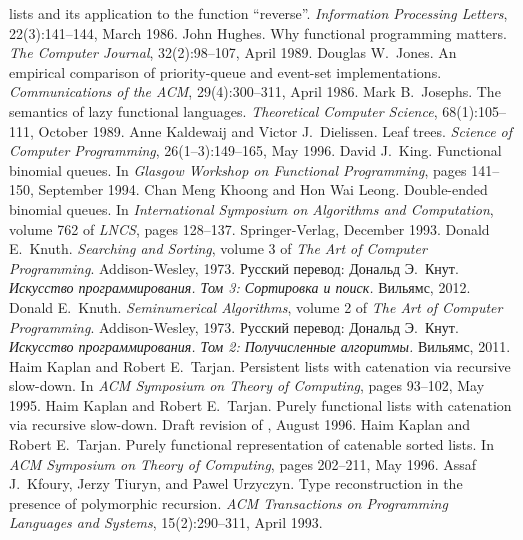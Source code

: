 \begin{thebibliography}{XXXXXXX}
  lists and its application to the function
  ``reverse''. \textit{Information Processing Letters},
  22(3):141--144, March 1986.
 John Hughes. Why functional programming
  matters. \textit{The Computer Journal}, 32(2):98--107, April 1989.
 Douglas W.~Jones. An empirical comparison
  of priority-queue and event-set
  implementations. \textit{Communications of the ACM}, 29(4):300--311,
  April 1986.
 Mark B.~Josephs. The semantics of lazy
  functional languages. \textit{Theoretical Computer Science},
  68(1):105--111, October 1989.
 Anne Kaldewaij and Victor
  J.~Dielissen. Leaf trees. \textit{Science of Computer Programming},
  26(1--3):149--165, May 1996.
 David J.~King. Functional binomial
  queues. In \textit{Glasgow Workshop on Functional Programming},
  pages 141--150, September 1994.
 Chan Meng Khoong and Hon Wai
  Leong. Double-ended binomial queues. In \textit{International
    Symposium on Algorithms and Computation}, volume 762 of
  \textit{LNCS}, pages 128--137. Springer-Verlag, December 1993.
 Donald E.~Knuth. \textit{Searching and
    Sorting}, volume 3 of \textit{The Art of Computer
    Programming}. Addison-Wesley, 1973. Русский перевод: Дональд
  Э.~Кнут. \textit{Искусство программирования. Том 3: Сортировка и
    поиск.}\/ Вильямс, 2012.
 Donald E.~Knuth. \textit{Seminumerical
    Algorithms}, volume 2 of \textit{The Art of Computer
    Programming}. Addison-Wesley, 1973. Русский перевод: Дональд
  Э.~Кнут. \textit{Искусство программирования. Том 2: Получисленные
    алгоритмы.}\/ Вильямс, 2011.
 Haim Kaplan and Robert
  E.~Tarjan. Persistent lists with catenation via recursive
  slow-down. In \textit{ACM Symposium on Theory of Computing}, pages
  93--102, May 1995.
 Haim Kaplan and Robert
  E.~Tarjan. Purely functional lists with catenation via recursive
  slow-down. Draft revision of \cite{KaplanTarjan1995}, August 1996.
 Haim Kaplan and Robert
  E.~Tarjan. Purely functional representation of catenable sorted
  lists. In \textit{ACM Symposium on Theory of Computing}, pages
  202--211, May 1996.
 Assaf J.~Kfoury, Jerzy
  Tiuryn, and Pawel Urzyczyn. Type reconstruction in the presence of
  polymorphic recursion. \textit{ACM Transactions on Programming
    Languages and Systems}, 15(2):290--311, April 1993.

\end{thebibliography}
